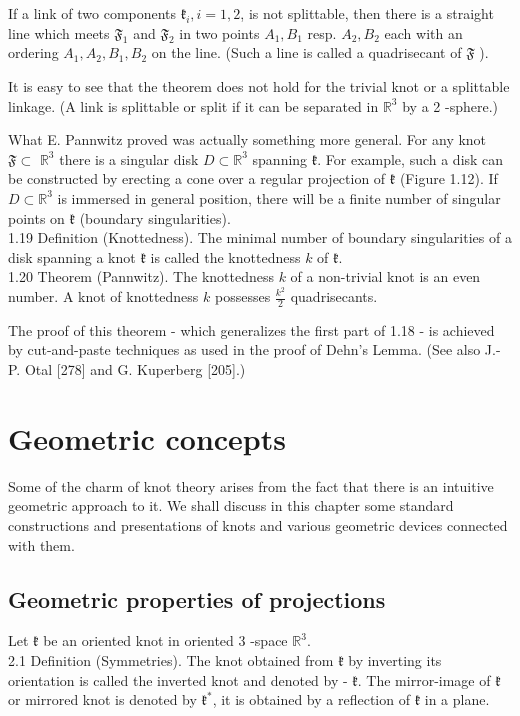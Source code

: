 \documentclass[10pt, letterpaper]{article}
\begin{document}
If a link of two components $\mathfrak{k}_{i}, i=1,2$, is not splittable, then there is a straight line which meets $\mathfrak{F}_{1}$ and $\mathfrak{F}_{2}$ in two points $A_{1}, B_{1}$ resp. $A_{2}, B_{2}$ each with an ordering $A_{1}, A_{2}, B_{1}, B_{2}$ on the line. (Such a line is called a quadrisecant of $\mathfrak{F}$ ).

It is easy to see that the theorem does not hold for the trivial knot or a splittable linkage. (A link is splittable or split if it can be separated in $\mathbb{R}^{3}$ by a 2 -sphere.)

What E. Pannwitz proved was actually something more general. For any knot $\mathfrak{F} \subset$ $\mathbb{R}^{3}$ there is a singular disk $D \subset \mathbb{R}^{3}$ spanning $\mathfrak{k}$. For example, such a disk can be constructed by erecting a cone over a regular projection of $\mathfrak{k}$ (Figure 1.12). If $D \subset \mathbb{R}^{3}$ is immersed in general position, there will be a finite number of singular points on $\mathfrak{k}$ (boundary singularities).\\
1.19 Definition (Knottedness). The minimal number of boundary singularities of a disk spanning a knot $\mathfrak{k}$ is called the knottedness $k$ of $\mathfrak{k}$.\\
1.20 Theorem (Pannwitz). The knottedness $k$ of a non-trivial knot is an even number. A knot of knottedness $k$ possesses $\frac{k^{2}}{2}$ quadrisecants.

The proof of this theorem - which generalizes the first part of 1.18 - is achieved by cut-and-paste techniques as used in the proof of Dehn's Lemma. (See also J.-P. Otal [278] and G. Kuperberg [205].)





\pagebreak


\section{Geometric concepts}



Some of the charm of knot theory arises from the fact that there is an intuitive geometric approach to it. We shall discuss in this chapter some standard constructions and presentations of knots and various geometric devices connected with them.

\subsection{Geometric properties of projections}
Let $\mathfrak{k}$ be an oriented knot in oriented 3 -space $\mathbb{R}^{3}$.\\
2.1 Definition (Symmetries). The knot obtained from $\mathfrak{k}$ by inverting its orientation is called the inverted knot and denoted by - $\mathfrak{k}$. The mirror-image of $\mathfrak{k}$ or mirrored knot is denoted by $\mathfrak{k}^{*}$, it is obtained by a reflection of $\mathfrak{k}$ in a plane.
\end{document}
